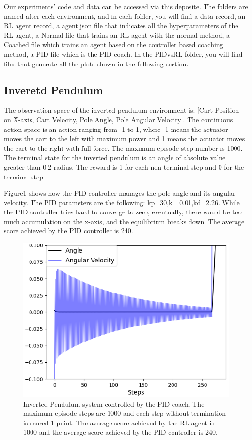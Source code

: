 \documentclass[journal]{IEEEtran}
\begin{document}
Our experiments' code and data can be accessed via \href{https://github.com/BaiLiping/Coaching}{this deposite}. The folders are named after each environment, and in each folder, you will find a data record, an RL agent record, a agent.json file that indicates all the hyperparameters of the RL agent, a Normal file that trains an RL agent with the normal method, a Coached file which trains an agent based on the controller based coaching method, a PID file which is the PID coach. In the PIDvsRL folder, you will find files that generate all the plots shown in the following section.
\subsection{Inveretd Pendulum}
The observation space of the inverted pendulum environment is: [Cart Position on X-axis, Cart Velocity, Pole Angle, Pole Angular Velocity]. The continuous action space is an action ranging from -1 to 1, where -1 means the actuator moves the cart to the left with maximum power and 1 means the actuator moves the cart to the right with full force. The maximum episode step number is 1000. The terminal state for the inverted pendulum is an angle of absolute value greater than 0.2 radius. The reward is 1 for each non-terminal step and 0 for the terminal step. 

Figure\ref{fig:ip} shows how the PID controller manages the pole angle and its angular velocity. The PID parameters are the following: kp=30,ki=0.01,kd=2.26. While the PID controller tries hard to converge to zero, eventually, there would be too much accumulation on the x-axis, and the equilibrium breaks down. The average score achieved by the PID controller is 240.
\begin{figure}[H]
  \centering
  \includegraphics[width=0.5\linewidth]{ip_PID.png}
  \caption{Inverted Pendulum system controlled by the PID coach. The maximum episode steps are 1000 and each step without termination is scored 1 point. The average score achieved by the RL agent is 1000 and the average score achieved by the PID controller is 240.}
\label{fig:ip}
\end{figure}
\end{document}
